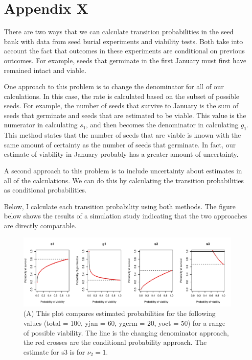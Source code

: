 \documentclass[12pt, oneside]{article}   	%
\begin{document}
\section*{Appendix X}

There are two ways that we can calculate transition probabilities in the seed bank with data from seed burial experiments and viability tests. Both take into account the fact that outcomes in these experiments are conditional on previous outcomes. For example, seeds that germinate in the first January must first have remained intact and viable. 

One approach to this problem is to change the denominator for all of our calculations. In this case, the rate is calculated based on the subset of possible seeds. For example, the number of seeds that survive to January is the sum of seeds that germinate and seeds that are estimated to be viable. This value is the numerator in calculating $s_1$, and then becomes the denominator in calculating $g_1$. This method states that the number of seeds that are viable is known with the same amount of certainty as the number of seeds that germinate. In fact, our estimate of viability in January probably has a greater amount of uncertainty. 

A second approach to this problem is to include uncertainty about estimates in all of the calculations. We can do this by calculating the transition probabilities as conditional probabilities. 

Below, I calculate each transition probability using both methods. The figure below shows the results of a simulation study indicating that the two approaches are directly comparable. 
%
 \begin{figure}[h]
   \centering
       \includegraphics[page=1,width=\textwidth]{../figures/appendix/comparison}  
    \caption{ (A) This plot compares estimated probabilities for the following values (total = 100, yjan = 60, ygerm = 20, yoct = 50) for a range of possible viability. The line is the changing denominator approach, the red crosses are the conditional probability approach. The estimate for s3 is for $\nu_2 = 1$. }
 \label{fig:comparison}
\end{figure}
%
\end{document}
